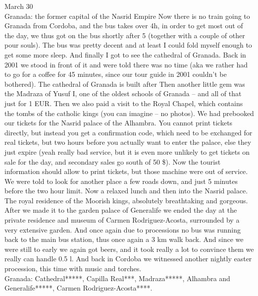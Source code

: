 March 30\\
Granada: the former capital of the Nasrid Empire
Now there is no train going to Granada from Cordoba, and the bus takes over 4h, in order to get most out of the day, we thus got on the bus shortly after 5 (together with a couple of other pour souls). The bus was pretty decent and at least I could fold myself enough to get some more sleep. And finally I got to see the cathedral of Granada. Back in 2001 we stood in front of it and were told there was no time (aka we rather had to go for a coffee for 45 minutes, since our tour guide in 2001 couldn't be bothered). The cathedral of Granada is built after Then another little gem was the Madraza of Yusuf I, one of the oldest schools of Granada -- and all of that just for 1 EUR. Then we also paid a visit to the Royal Chapel, which contains the tombs of the catholic kings (you can imagine -- no photos). We had prebooked our tickets for the Nasrid palace of the Alhambra. You cannot print tickets directly, but instead you get a confirmation code, which need to be exchanged for real tickets, but two hours before you actually want to enter the palace, else they just expire (yeah really bad service, but it is even more unlikely to get tickets on sale for the day, and secondary sales go south of 50 \$). Now the tourist information should allow to print tickets, but those machine were out of service. We were told to look for another place a few roads down, and just 5 minutes before the two hour limit. Now a relaxed lunch and then into the Nasrid palace. The royal residence of the Moorish kings, absolutely breathtaking and gorgeous. After we made it to the garden palace of Generalife we ended the day at the private residence and museum of Carmen Rodriguez-Acosta, surrounded by a very extensive garden. And once again due to processions no bus was running back to the main bus station, thus once again a 3 km walk back. And since we were still to early we again got beers, and it took really a lot to convince them we really can handle 0.5 l. And back in Cordoba we witnessed another nightly easter procession, this time with music and torches.\\

Granada: Cathedral*****,
Capilla Real***,
Madraza*****,
Alhambra and Generalife*****,
Carmen Rodriguez-Acosta****.\\

